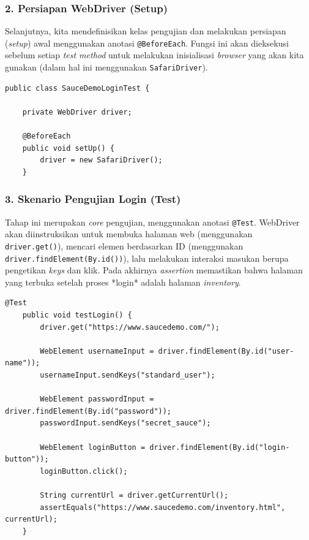 \documentclass[a4paper,oneside,12pt]{report}
\begin{document}
\subsubsection*{2. Persiapan WebDriver (Setup)}
Selanjutnya, kita mendefinisikan kelas pengujian dan melakukan persiapan (\textit{setup}) awal menggunakan anotasi \texttt{@BeforeEach}. Fungsi ini akan dieksekusi sebelum setiap \textit{test method} untuk melakukan inisialisasi \textit{browser} yang akan kita gunakan (dalam hal ini menggunakan \texttt{SafariDriver}).

\begin{lstlisting}[style=javastyle, caption=Inisialisasi Kelas dan Setup WebDriver]
public class SauceDemoLoginTest {

    private WebDriver driver;

    @BeforeEach
    public void setUp() {
        driver = new SafariDriver();
    }
\end{lstlisting}

\subsubsection*{3. Skenario Pengujian Login (Test)}
Tahap ini merupakan \textit{core} pengujian, menggunakan anotasi \texttt{@Test}. WebDriver akan diinstruksikan untuk membuka halaman web (menggunakan \texttt{driver.get()}), mencari elemen berdasarkan ID (menggunakan \texttt{driver.findElement(By.id())}), lalu melakukan interaksi masukan berupa pengetikan \textit{keys} dan klik. Pada akhirnya \textit{assertion} memastikan bahwa halaman yang terbuka setelah proses *login* adalah halaman \textit{inventory}.

\begin{lstlisting}[style=javastyle, caption=Test Method Login Sederhana]
    @Test
    public void testLogin() {
        driver.get("https://www.saucedemo.com/");

        WebElement usernameInput = driver.findElement(By.id("user-name"));
        usernameInput.sendKeys("standard_user");

        WebElement passwordInput = driver.findElement(By.id("password"));
        passwordInput.sendKeys("secret_sauce");

        WebElement loginButton = driver.findElement(By.id("login-button"));
        loginButton.click();

        String currentUrl = driver.getCurrentUrl();
        assertEquals("https://www.saucedemo.com/inventory.html", currentUrl);
    }
\end{lstlisting}
\end{document}
